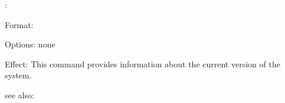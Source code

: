 \colab{} \version:

Format: 

Options: none

Effect: This command provides information about the current version
        of the \COLAB{} system.

see also: 
